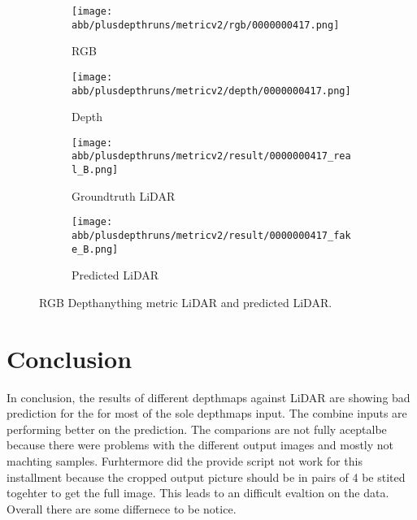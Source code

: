 \begin{figure}[!ht]
	\centering
	
	\begin{subfigure}{0.4\textwidth}
		\centering
		\texttt{[image: abb/plusdepthruns/metricv2/rgb/0000000417.png]}
		\caption{RGB}
		\label{fig:bild1}
	\end{subfigure}
	
	\vspace{1em} %
	
	\begin{subfigure}{0.4\textwidth}
		\centering
		\texttt{[image: abb/plusdepthruns/metricv2/depth/0000000417.png]}
		\caption{Depth}
		\label{fig:bild2}
	\end{subfigure}
	
	\vspace{1em} %
	
	\begin{subfigure}{0.25\textwidth}
		\centering
		\texttt{[image: abb/plusdepthruns/metricv2/result/0000000417\_real\_B.png]}
		\caption{Groundtruth LiDAR}
		\label{fig:bild3}
	\end{subfigure}
	\begin{subfigure}{0.25\textwidth}
		\centering
		\texttt{[image: abb/plusdepthruns/metricv2/result/0000000417\_fake\_B.png]}
		\caption{Predicted LiDAR}
		\label{fig:bild4}
	\end{subfigure}
	
	\caption{RGB Depthanything metric LiDAR and predicted LiDAR.}
	\label{metric_rgbd}
\end{figure}
\chapter{Conclusion}
In conclusion, the results of different depthmaps against LiDAR are showing bad prediction for the for most of the sole depthmaps input. The combine inputs are performing better on the prediction. The comparions are not fully aceptalbe because there were problems with the different output images and mostly not machting samples. Furhtermore did the provide script not work for this installment because the cropped output picture should be in pairs of 4 be stited togehter to get the full image. This leads to an difficult evaltion on the data. Overall there are some differnece to be notice. 

